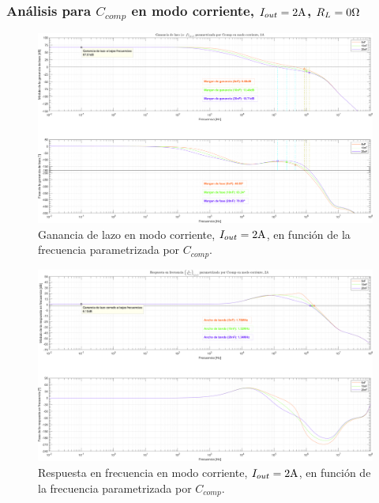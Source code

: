 \clearpage


\subsubsection{Análisis para $C_{comp}$ en modo corriente, $I_{out} = 2 \si[per-mode=symbol]{\ampere}$, $R_{L} = 0 \si[per-mode=symbol]{\ohm}$}

\clearpage

\begin{figure}[H] %
\begin{center}
\includegraphics[width=1.1 \textwidth, angle=90]{./img/plots/loop/power_supply_CCOMP_LOOP_Modo3.png}
\caption{\label{fig:fig_power_supply_CCOMP_LOOP_Modo3}\footnotesize{Ganancia de lazo en modo corriente, $I_{out} = 2 \si[per-mode=symbol]{\ampere}$, en función de la frecuencia parametrizada por $C_{comp}$.}}
\end{center}
\end{figure}


\clearpage

\begin{figure}[H] %
\begin{center}
\includegraphics[width=1.1 \textwidth, angle=90]{./img/plots/rf/power_supply_CCOMP_RF_Modo3.png}
\caption{\label{fig:fig_power_supply_CCOMP_RF_Modo3}\footnotesize{Respuesta en frecuencia en modo corriente, $I_{out} = 2 \si[per-mode=symbol]{\ampere}$, en función de la frecuencia parametrizada por $C_{comp}$.}}
\end{center}
\end{figure}

